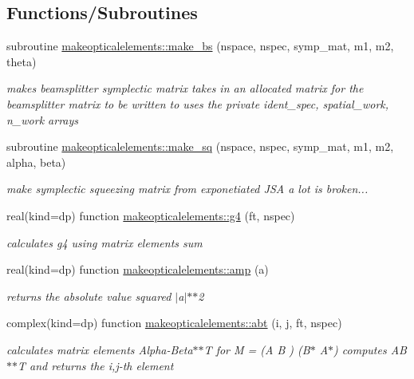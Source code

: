 \subsection*{Functions/\+Subroutines}
\begin{DoxyCompactItemize}
\item 
subroutine \hyperlink{namespacemakeopticalelements_a593a6ee34afdeebc8b4667791c8a144f}{makeopticalelements\+::make\+\_\+bs} (nspace, nspec, symp\+\_\+mat, m1, m2, theta)
\begin{DoxyCompactList}\small\item\em makes beamsplitter symplectic matrix  takes in an allocated matrix for the beamsplitter matrix to be written to uses the private ident\+\_\+spec, spatial\+\_\+work, n\+\_\+work arrays \end{DoxyCompactList}\item 
subroutine \hyperlink{namespacemakeopticalelements_a6658c2ce879c0bc4b2e5918064a6a308}{makeopticalelements\+::make\+\_\+sq} (nspace, nspec, symp\+\_\+mat, m1, m2, alpha, beta)
\begin{DoxyCompactList}\small\item\em make symplectic squeezing matrix from exponetiated J\+SA  a lot is broken... \end{DoxyCompactList}\item 
real(kind=dp) function \hyperlink{namespacemakeopticalelements_af1a18704c55aa2efeb60157c81a80723}{makeopticalelements\+::g4} (ft, nspec)
\begin{DoxyCompactList}\small\item\em calculates g4 using matrix elements sum  \end{DoxyCompactList}\item 
real(kind=dp) function \hyperlink{namespacemakeopticalelements_a0649740479f47221d009b8d496b78c8b}{makeopticalelements\+::amp} (a)
\begin{DoxyCompactList}\small\item\em returns the absolute value squared $\vert$a$\vert$$\ast$$\ast$2 \end{DoxyCompactList}\item 
complex(kind=dp) function \hyperlink{namespacemakeopticalelements_a1b408449683f6bcc96ee25d4bbc1aa8b}{makeopticalelements\+::abt} (i, j, ft, nspec)
\begin{DoxyCompactList}\small\item\em calculates matrix elements Alpha-\/\+Beta$\ast$$\ast$T  for M = (A B ) (B$\ast$ A$\ast$) computes A\+B$\ast$$\ast$T and returns the i,j-\/th element \end{DoxyCompactList}\item 

\end{DoxyCompactItemize}

